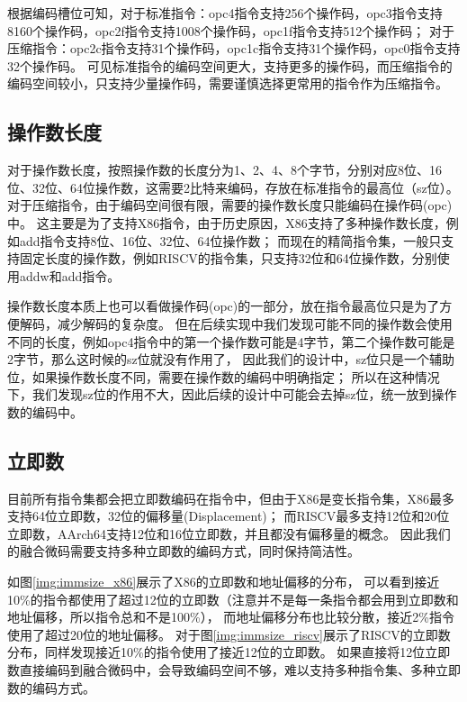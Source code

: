 根据编码槽位可知，对于标准指令：opc4指令支持256个操作码，opc3指令支持8160个操作码，opc2f指令支持1008个操作码，opc1f指令支持512个操作码；
对于压缩指令：opc2c指令支持31个操作码，opc1c指令支持31个操作码，opc0指令支持32个操作码。
可见标准指令的编码空间更大，支持更多的操作码，而压缩指令的编码空间较小，只支持少量操作码，需要谨慎选择更常用的指令作为压缩指令。

\subsection{操作数长度}
对于操作数长度，按照操作数的长度分为1、2、4、8个字节，分别对应8位、16位、32位、64位操作数，这需要2比特来编码，存放在标准指令的最高位（sz位）。
对于压缩指令，由于编码空间很有限，需要的操作数长度只能编码在操作码(opc)中。
这主要是为了支持X86指令，由于历史原因，X86支持了多种操作数长度，例如add指令支持8位、16位、32位、64位操作数；
而现在的精简指令集，一般只支持固定长度的操作数，例如RISCV的指令集，只支持32位和64位操作数，分别使用addw和add指令。

操作数长度本质上也可以看做操作码(opc)的一部分，放在指令最高位只是为了方便解码，减少解码的复杂度。
但在后续实现中我们发现可能不同的操作数会使用不同的长度，例如opc4指令中的第一个操作数可能是4字节，第二个操作数可能是2字节，那么这时候的sz位就没有作用了，
因此我们的设计中，sz位只是一个辅助位，如果操作数长度不同，需要在操作数的编码中明确指定；
所以在这种情况下，我们发现sz位的作用不大，因此后续的设计中可能会去掉sz位，统一放到操作数的编码中。

\subsection{立即数}

目前所有指令集都会把立即数编码在指令中，但由于X86是变长指令集，X86最多支持64位立即数，32位的偏移量(Displacement)；
而RISCV最多支持12位和20位立即数，AArch64支持12位和16位立即数，并且都没有偏移量的概念。
因此我们的融合微码需要支持多种立即数的编码方式，同时保持简洁性。

如图\ref{img:immsize_x86}展示了X86的立即数和地址偏移的分布，
可以看到接近10\%的指令都使用了超过12位的立即数（注意并不是每一条指令都会用到立即数和地址偏移，所以指令总和不是100\%），
而地址偏移分布也比较分散，接近2\%指令使用了超过20位的地址偏移。
对于图\ref{img:immsize_riscv}展示了RISCV的立即数分布，同样发现接近10\%的指令使用了接近12位的立即数。
如果直接将12位立即数直接编码到融合微码中，会导致编码空间不够，难以支持多种指令集、多种立即数的编码方式。

